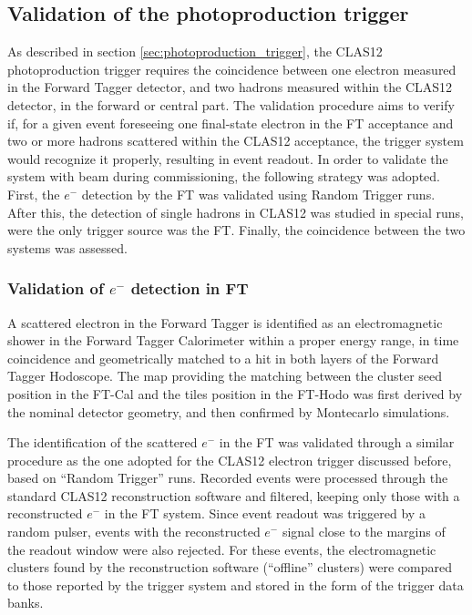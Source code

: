 \subsection{Validation of the photoproduction trigger}

As described in section \ref{sec:photoproduction_trigger}, the CLAS12 photoproduction trigger requires the coincidence between one electron measured in the Forward Tagger detector, and two hadrons measured within the CLAS12 detector, in the forward or central part. The validation procedure aims to verify if, for a given event foreseeing one final-state electron in the FT acceptance and two or more hadrons scattered within the CLAS12 acceptance, the trigger system would recognize it properly, resulting in event readout. In order to validate the system with beam during commissioning, the following strategy was adopted. First, the $e^-$ detection by the FT was validated using Random Trigger runs. After this, the detection of single hadrons in CLAS12 was studied in special runs, were the only trigger source was the FT. Finally, the coincidence between the two systems was assessed.

\subsubsection{Validation of $e^-$ detection in FT}

A scattered electron in the Forward Tagger is identified as an electromagnetic shower in the Forward Tagger Calorimeter within a proper energy range, in time coincidence and geometrically matched to a hit in both layers of the Forward Tagger Hodoscope. The map providing the matching between the cluster seed position in the FT-Cal and the tiles position in the FT-Hodo was first derived by the nominal detector geometry, and then confirmed by Montecarlo simulations.

The identification of the scattered $e^-$ in the FT was validated through a similar procedure as the one adopted for the CLAS12 electron trigger discussed before, based on ``Random Trigger'' runs. Recorded events were processed through the standard CLAS12 reconstruction software and filtered, keeping only those with a reconstructed $e^-$ in the FT system. Since event readout was triggered by a random pulser, events with the reconstructed $e^-$ signal close to the margins of the readout window were also rejected.
For these events, the electromagnetic clusters found by the reconstruction software (``offline'' clusters) were compared to those reported by the trigger system and stored in the form of the trigger data banks.


